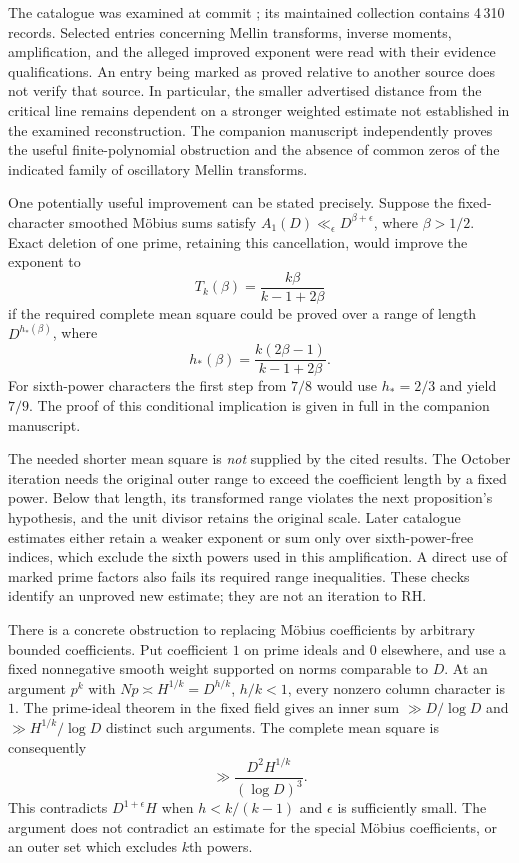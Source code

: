 \documentclass[11pt,a4paper]{article}
\theoremstyle{remark}
\newcommand{\src}[1]{\cite{#1}}
\begin{document}
The catalogue was examined at commit
; its maintained
collection contains 4\,310 records. Selected entries concerning
Mellin transforms, inverse moments, amplification, and the alleged
improved exponent were read with their evidence qualifications.
An entry being marked as proved relative to another source does not
verify that source. In particular, the smaller advertised distance
from the critical line remains dependent on a stronger weighted
estimate not established in the examined reconstruction.
The companion manuscript independently proves the useful
finite-polynomial obstruction and the absence of common zeros of
the indicated family of oscillatory Mellin transforms.\src{qrh-catalogue}

One potentially useful improvement can be stated precisely. Suppose
the fixed-character smoothed M\"obius sums satisfy
$A_1(D)\ll_\epsilon D^{\beta+\epsilon}$, where $\beta>1/2$.
Exact deletion of one prime, retaining this cancellation, would
improve the exponent to
\[
 T_k(\beta)=\frac{k\beta}{k-1+2\beta}
\]
if the required complete mean square could be proved over a range
of length $D^{h_*(\beta)}$, where
\[
 h_*(\beta)=\frac{k(2\beta-1)}{k-1+2\beta}.
\]
For sixth-power characters the first step from $7/8$ would use
$h_*=2/3$ and yield $7/9$. The proof of this conditional implication
is given in full in the companion manuscript.

The needed shorter mean square is \emph{not} supplied by the cited
results. The October iteration needs the original outer range to
exceed the coefficient length by a fixed power. Below that length,
its transformed range violates the next proposition's hypothesis,
and the unit divisor retains the original scale. Later catalogue
estimates either retain a weaker exponent or sum only over
sixth-power-free indices, which exclude the sixth powers used in
this amplification. A direct use of marked prime factors also
fails its required range inequalities. These checks identify an
unproved new estimate; they are not an iteration to RH.

There is a concrete obstruction to replacing M\"obius coefficients
by arbitrary bounded coefficients. Put coefficient $1$ on prime
ideals and $0$ elsewhere, and use a fixed nonnegative smooth weight
supported on norms comparable to $D$. At an argument $p^k$ with
$Np\asymp H^{1/k}=D^{h/k}$, $h/k<1$, every nonzero column
character is $1$. The prime-ideal theorem in the fixed field gives
an inner sum $\gg D/\log D$ and
$\gg H^{1/k}/\log D$ distinct such arguments. The complete
mean square is consequently
\[
 \gg \frac{D^2H^{1/k}}{(\log D)^3}.
\]
This contradicts $D^{1+\epsilon}H$ when
$h<k/(k-1)$ and $\epsilon$ is sufficiently small. The argument
does not contradict an estimate for the special M\"obius
coefficients, or an outer set which excludes $k$th powers.
\end{document}
